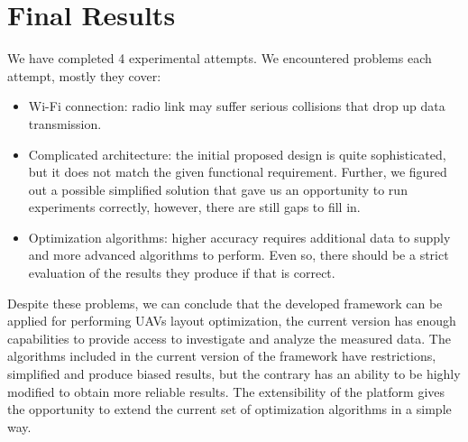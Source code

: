 \clearpage
\section{Final Results}\label{final-results}

We have completed 4 experimental attempts. We encountered problems each
attempt, mostly they cover:

\begin{itemize}
\tightlist
\item
  Wi-Fi connection: radio link may suffer serious collisions that drop
  up data transmission.
\item
  Complicated architecture: the initial proposed design is
  quite sophisticated, but it does not match the given functional
  requirement. Further, we figured out a possible simplified solution
  that gave us an opportunity to run experiments correctly, however,
  there are still gaps to fill in.
\item
  Optimization algorithms: higher accuracy requires additional data to
  supply and more advanced algorithms to perform. Even so, there should
  be a strict evaluation of the results they produce if that is correct.
\end{itemize}

Despite these problems, we can conclude that the developed framework can
be applied for performing UAVs layout optimization, the current version
has enough capabilities to provide access to investigate and analyze the
measured data. The algorithms included in the current version of the
framework have restrictions, simplified and produce biased results, but
the contrary has an ability to be highly modified to obtain more
reliable results. The extensibility of the platform gives the
opportunity to extend the current set of optimization algorithms in a
simple way.
